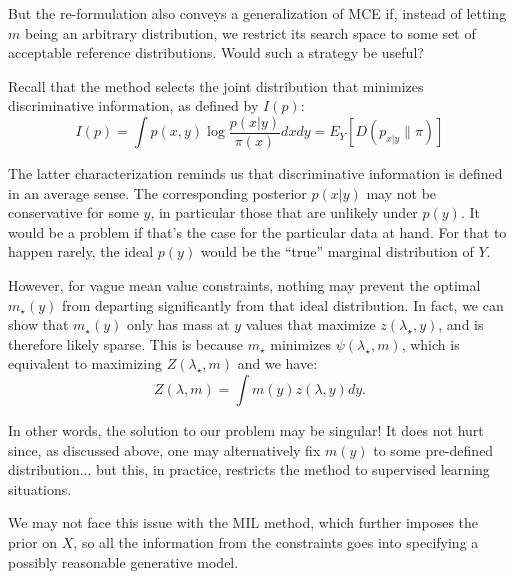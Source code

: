 \documentclass[english]{scrartcl}
\begin{document}
But the re-formulation also conveys a generalization of MCE if,
instead of letting $m$ being an arbitrary distribution, we restrict
its search space to some set of acceptable reference
distributions. Would such a strategy be useful? 

Recall that the method selects the joint distribution that minimizes
discriminative information, as defined by $I(p)$:
$$
I(p) 
= \int p(x,y)\log\frac{p(x|y)}{\pi(x)} dxdy
= E_Y[D(p_{x|y}\|\pi)]
$$

The latter characterization reminds us that discriminative information
is defined in an average sense. The corresponding posterior $p(x|y)$
may not be conservative for some $y$, in particular those that are
unlikely under $p(y)$. It would be a problem if that's the case for
the particular data at hand. For that to happen rarely, the ideal
$p(y)$ would be the ``true'' marginal distribution of $Y$.

However, for vague mean value constraints, nothing may prevent the
optimal $m_\star(y)$ from departing significantly from that ideal
distribution. In fact, we can show that $m_\star(y)$ only has mass at
$y$ values that maximize $z(\lambda_\star,y)$, and is therefore likely
sparse. This is because $m_\star$ minimizes $\psi(\lambda_\star,m)$,
which is equivalent to maximizing $Z(\lambda_\star,m)$ and we have:
$$
Z(\lambda, m) = \int m(y) z(\lambda, y) dy.
$$

In other words, the solution to our problem may be singular! It does
not hurt since, as discussed above, one may alternatively fix $m(y)$
to some pre-defined distribution... but this, in practice, restricts
the method to supervised learning situations.

We may not face this issue with the MIL method, which further imposes
the prior on $X$, so all the information from the constraints goes
into specifying a possibly reasonable generative model.






\end{document}

